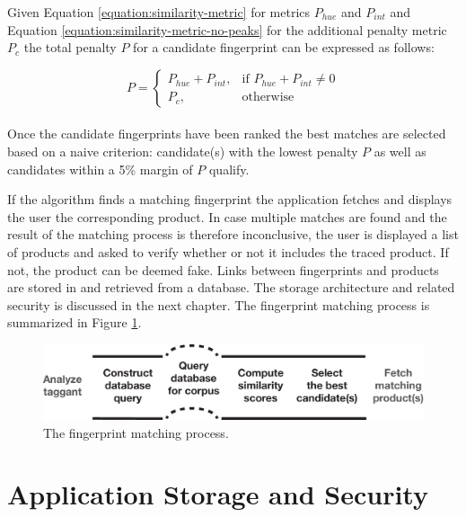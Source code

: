 \documentclass[thesis.tex]{subfiles}
\begin{document}
\noindent Given Equation \ref{equation:similarity-metric} for metrics $P_{hue}$ and $P_{int}$ and Equation \ref{equation:similarity-metric-no-peaks} for the additional penalty metric $P_c$ the total penalty $P$ for a candidate fingerprint can be expressed as follows:

\begin{equation}
	P =
	\begin{cases}
	P_{hue} + P_{int}, & \text{if } P_{hue} + P_{int} \neq 0 \\
	P_{c}, & \text{otherwise}
	\end{cases}
\end{equation}
\\
Once the candidate fingerprints have been ranked the best matches are selected based on a naive criterion: candidate(s) with the lowest penalty $P$ as well as candidates within a 5\% margin of $P$ qualify.

If the algorithm finds a matching fingerprint the application fetches and displays the user the corresponding product. In case multiple matches are found and the result of the matching process is therefore inconclusive, the user is displayed a list of products and asked to verify whether or not it includes the traced product. If not, the product can be deemed fake. Links between fingerprints and products are stored in and retrieved from a database. The storage architecture and related security is discussed in the next chapter. The fingerprint matching process is summarized in Figure \ref{figure:matching-process}.

\begin{figure}[h]
\centering \includegraphics[width=\textwidth,height=\textheight,keepaspectratio=true]{images/design_implementation/matching_process}
\caption{The fingerprint matching process.\label{figure:matching-process}}
\end{figure}

\section{Application Storage and Security}
\label{chapter:storage-security}
\end{document}
